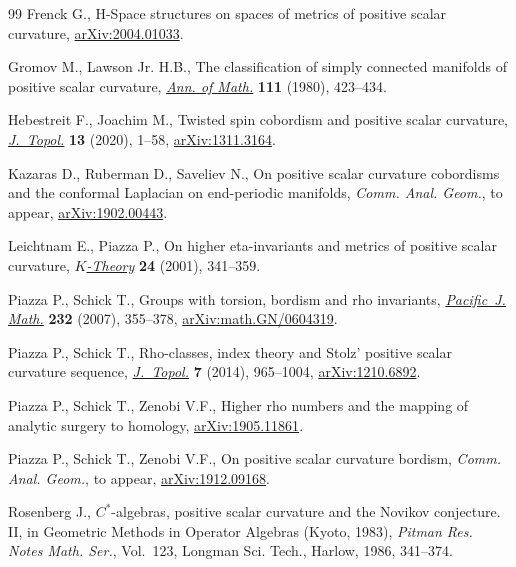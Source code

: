 \documentclass[pdftex]{sigma}
\numberwithin{equation}{section}
\begin{document}
\begin{thebibliography}{99}
Frenck G., H-Space structures on spaces of metrics of positive scalar
 curvature, \href{https://arxiv.org/abs/2004.01033}{arXiv:2004.01033}.

Gromov M., Lawson Jr. H.B., The classification of simply connected manifolds of
 positive scalar curvature, \href{https://doi.org/10.2307/1971103}{\textit{Ann. of Math.}} \textbf{111} (1980),
 423--434.

Hebestreit F., Joachim M., Twisted spin cobordism and positive scalar
 curvature, \href{https://doi.org/10.1112/topo.12122}{\textit{J.~Topol.}} \textbf{13} (2020), 1--58, \href{https://arxiv.org/abs/1311.3164}{arXiv:1311.3164}.

Kazaras D., Ruberman D., Saveliev N., On positive scalar curvature cobordisms
 and the conformal {L}aplacian on end-periodic manifolds, \textit{Comm. Anal.
 Geom.}, {t}o appear, \href{https://arxiv.org/abs/1902.00443}{arXiv:1902.00443}.

Leichtnam E., Piazza P., On higher eta-invariants and metrics of positive
 scalar curvature, \href{https://doi.org/10.1023/A:1014079307698}{\textit{$K$-Theory}} \textbf{24} (2001), 341--359.

Piazza P., Schick T., Groups with torsion, bordism and rho invariants,
 \href{https://doi.org/10.2140/pjm.2007.232.355}{\textit{Pacific~J. Math.}} \textbf{232} (2007), 355--378,
 \href{https://arxiv.org/abs/math.GN/0604319}{arXiv:math.GN/0604319}.

Piazza P., Schick T., Rho-classes, index theory and {S}tolz' positive scalar
 curvature sequence, \href{https://doi.org/10.1112/jtopol/jtt048}{\textit{J.~Topol.}} \textbf{7} (2014), 965--1004,
 \href{https://arxiv.org/abs/1210.6892}{arXiv:1210.6892}.

Piazza P., Schick T., Zenobi V.F., Higher rho numbers and the mapping of
 analytic surgery to homology, \href{https://arxiv.org/abs/1905.11861}{arXiv:1905.11861}.

Piazza P., Schick T., Zenobi V.F., On positive scalar curvature bordism,
 \textit{Comm. Anal. Geom.}, {t}o appear, \href{https://arxiv.org/abs/1912.09168}{arXiv:1912.09168}.

Rosenberg J., {$C^\ast$}-algebras, positive scalar curvature and the {N}ovikov
 conjecture. {II}, in Geometric Methods in Operator Algebras ({K}yoto, 1983),
 \textit{Pitman Res. Notes Math. Ser.}, Vol.~123, Longman Sci. Tech., Harlow,
 1986, 341--374.


\end{thebibliography}
\end{document}

